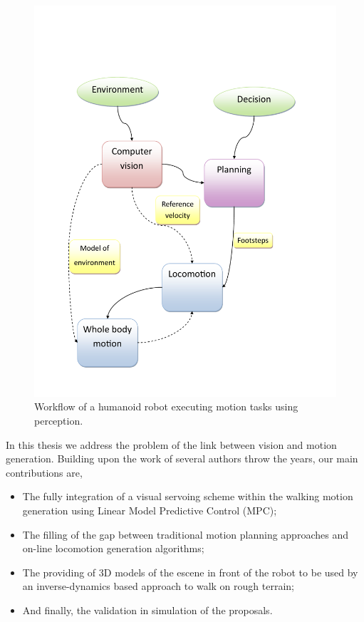 \begin{figure}[h]
\centering
\includegraphics[scale=0.5]{figures/general-diagram.pdf}
\caption[]{ \label{Fig:GeneralDiagram} Workflow of a humanoid robot executing motion tasks using perception.}
\end{figure}

In this thesis we address the problem of the link between vision and motion generation. Building upon the work of several authors throw the years, our main contributions are,

\begin{itemize}
\item The fully integration of a visual servoing scheme within the walking motion generation using Linear Model Predictive Control (MPC);
\item The filling of the gap between traditional motion planning approaches and on-line locomotion generation algorithms;
\item The providing of 3D models of the escene in front of the robot to be used by an inverse-dynamics based approach to walk on rough terrain;
\item And finally, the validation in simulation of the proposals.
\end{itemize}

